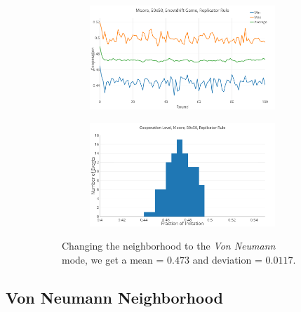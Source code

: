 \documentclass[a4paper, 11pt]{article}
\begin{document}
\begin{figure}[H]
\begin{subfigure}{.55\textwidth}
	\begin{subfigure}{1\textwidth}
		\includegraphics[width=1\linewidth]{SDMoore50x50}
	\end{subfigure}

	\begin{subfigure}{1\textwidth}
		\includegraphics[width=1\linewidth]{SDMoore50x50HG}
	\end{subfigure}
\end{subfigure}%
\begin{subfigure}{.45\textwidth}
	Changing the neighborhood to the \textit{Von Neumann} mode, we get a mean = $0.473$ and deviation = $0.0117$.
\end{subfigure}

\end{figure}




\newpage

\subsection{Von Neumann Neighborhood}
\end{document}

